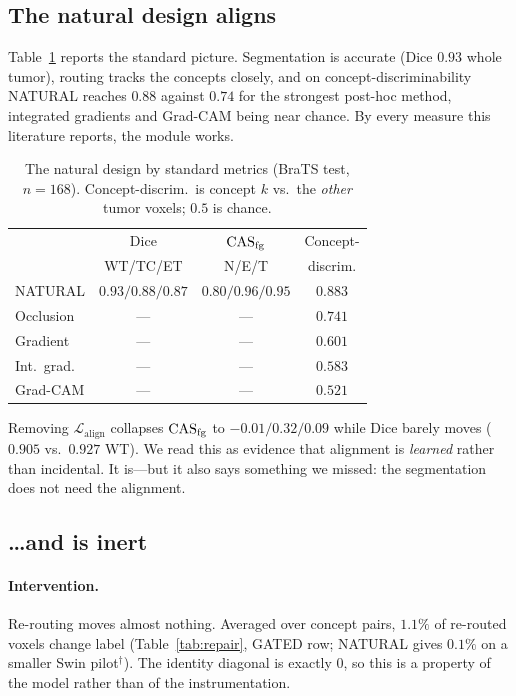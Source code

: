 \subsection{The natural design aligns}
\label{sec:aligns}
Table~\ref{tab:aligns} reports the standard picture. Segmentation is accurate (Dice $0.93$ whole
tumor), routing tracks the concepts closely, and on concept-discriminability NATURAL reaches
$0.88$ against $0.74$ for the
strongest post-hoc method, integrated gradients and Grad-CAM being near chance. By every measure
this literature reports, the module works.

\begin{table}[t]\centering\footnotesize
\setlength{\tabcolsep}{3.5pt}
\caption{The natural design by standard metrics (BraTS test, $n{=}168$). Concept-discrim.\ is
concept $k$ vs.\ the \emph{other} tumor voxels; $0.5$ is chance.}
\label{tab:aligns}
\begin{tabular}{lccc}
\toprule
& Dice & $\mathrm{CAS}_{\mathrm{fg}}$ & Concept- \\
& \scriptsize WT/TC/ET & \scriptsize N/E/T & discrim. \\
\midrule
NATURAL & $0.93/0.88/0.87$ & $0.80/0.96/0.95$ & $\mathbf{0.883}$ \\
\midrule
Occlusion   & --- & --- & $0.741$ \\
Gradient    & --- & --- & $0.601$ \\
Int.\ grad. & --- & --- & $0.583$ \\
Grad-CAM    & --- & --- & $0.521$ \\
\bottomrule
\end{tabular}
\end{table}

Removing $\mathcal{L}_{\text{align}}$ collapses $\mathrm{CAS}_{\mathrm{fg}}$ to $-0.01/0.32/0.09$ while Dice barely
moves ($0.905$ vs.\ $0.927$ WT). We read this as evidence that alignment is
\emph{learned} rather than incidental. It is---but it also says something we missed: the
segmentation does not need the alignment.

\subsection{\ldots and is inert}
\label{sec:inert}

\paragraph{Intervention.}
Re-routing moves almost nothing. Averaged over concept pairs, $1.1\%$ of re-routed voxels change
label (Table~\ref{tab:repair}, GATED row; NATURAL gives $0.1\%$ on a smaller Swin pilot$^\dagger$). The
identity diagonal is exactly $0$, so this is a property of the model rather than of the
instrumentation.

